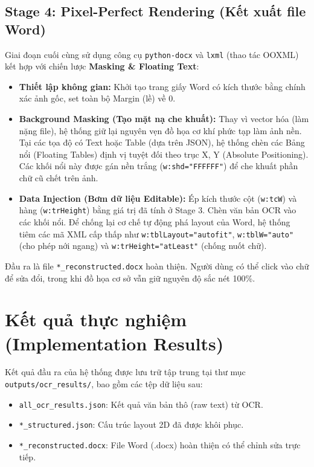 \documentclass[12pt,a4paper]{article}
\begin{document}
\subsection{Stage 4: Pixel-Perfect Rendering (Kết xuất file Word)}
Giai đoạn cuối cùng sử dụng công cụ \texttt{python-docx} và \texttt{lxml} (thao tác OOXML) kết hợp với chiến lược \textbf{Masking \& Floating Text}:
\begin{itemize}
    \item \textbf{Thiết lập không gian:} Khởi tạo trang giấy Word có kích thước bằng chính xác ảnh gốc, set toàn bộ Margin (lề) về 0.
    \item \textbf{Background Masking (Tạo mặt nạ che khuất):} Thay vì vector hóa (làm nặng file), hệ thống giữ lại nguyên vẹn đồ họa cơ khí phức tạp làm ảnh nền. Tại các tọa độ có Text hoặc Table (dựa trên JSON), hệ thống chèn các Bảng nổi (Floating Tables) định vị tuyệt đối theo trục X, Y (Absolute Positioning). Các khối nổi này được gán nền trắng (\texttt{w:shd="FFFFFF"}) để che khuất phần chữ cũ chết trên ảnh.
    \item \textbf{Data Injection (Bơm dữ liệu Editable):} Ép kích thước cột (\texttt{w:tcW}) và hàng (\texttt{w:trHeight}) bằng giá trị đã tính ở Stage 3. Chèn văn bản OCR vào các khối nổi. Để chống lại cơ chế tự động phá layout của Word, hệ thống tiêm các mã XML cấp thấp như \texttt{w:tblLayout="autofit"}, \texttt{w:tblW="auto"} (cho phép nới ngang) và \texttt{w:trHeight="atLeast"} (chống nuốt chữ).
\end{itemize}
Đầu ra là file \texttt{*\_reconstructed.docx} hoàn thiện. Người dùng có thể click vào chữ để sửa đổi, trong khi đồ họa cơ sở vẫn giữ nguyên độ sắc nét 100\%.

\section{Kết quả thực nghiệm (Implementation Results)}
Kết quả đầu ra của hệ thống được lưu trữ tập trung tại thư mục \texttt{outputs/ocr\_results/}, bao gồm các tệp dữ liệu sau:
\begin{itemize}
    \item \texttt{all\_ocr\_results.json}: Kết quả văn bản thô (raw text) từ OCR.
    \item \texttt{*\_structured.json}: Cấu trúc layout 2D đã được khôi phục.
    \item \texttt{*\_reconstructed.docx}: File Word (.docx) hoàn thiện có thể chỉnh sửa trực tiếp.
\end{itemize}
\end{document}

